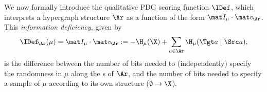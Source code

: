 We now formally introduce the qualitative PDG scoring function $\IDef$, which interprets a hypergraph structure $\Ar$ as a function of the form $\mat I_\mu \cdot \mat v_{\!\Ar}$.
This \emph{information deficiency}, given by
\begin{equation}
    \IDef_{\!\Ar}(\mu) 
    = \mat I_\mu \cdot \mat v_{\!\Ar} 
    := - \H_\mu(\X)  + \sum_{a \in \Ar} \H_\mu(\Tgt a \mid \Src a)
    ,
        \label{eq:idef}
\end{equation}
is the difference between the number of bits needed to (independently) specify the randomness in $\mu$ along the \arc s of $\Ar$, and
the number of bits needed to specify a sample of $\mu$ according to its own structure 
($\emptyset \to \X$).
